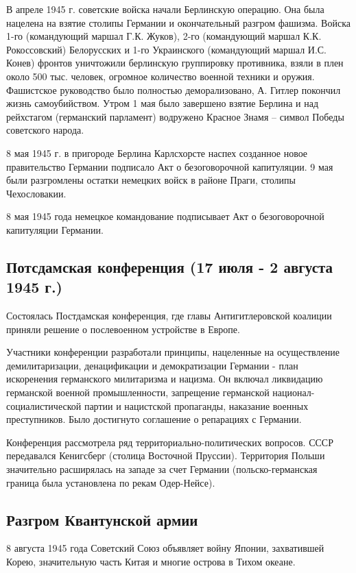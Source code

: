 В апреле 1945 г. советские войска начали Берлинскую операцию.
Она была нацелена на взятие столипы Германии и окончательный разгром фашизма. Войска 1-го (командующий маршал Г.К. Жуков), 2-го (командующий маршал К.К. Рокоссовский) Белорусских и 1-го Украинского (командующий маршал И.С. Конев) фронтов уничтожили берлинскую группировку противника, взяли в плен около 500 тыс. человек,
огромное количество военной техники и оружия. Фашистское руководство было полностью деморализовано, А. Гитлер покончил жизнь самоубийством. Утром 1 мая было завершено взятие Берлина и над рейхстагом (германский парламент) водружено Красное Знамя -- символ Победы советского народа.

8 мая 1945 г. в пригороде Берлина Карлсхорсте наспех созданное новое правительство Германии подписало Акт о безоговорочной капитуляции. 9 мая были разгромлены остатки немецких войск в районе Праги, столипы Чехословакии. 

8 мая 1945 года немецкое командование подписывает Акт о безоговорочной капитуляции Германии.

\subsection{Потсдамская конференция (17 июля - 2 августа 1945 г.)}

Состоялась Постдамская конференция, где главы Антигитлеровской коалиции приняли решение о послевоенном устройстве в Европе.

Участники конференции разработали принципы, нацеленные на осуществление демилитаризации, денацификации и демократизации Германии - план искоренения германского милитаризма и нацизма. Он включал ликвидацию германской военной промышленности, запрещение германской национал-социалистической партии и нацистской пропаганды, наказание военных преступников. Было достигнуто соглашение о репарациях с Германии.

Конференция рассмотрела ряд территориально-политических вопросов. СССР передавался Кенигсберг (столица Восточной Пруссии). Территория Польши значительно расширялась на западе за счет Германии (польско-германская граница была установлена по рекам Одер-Нейсе). 

\subsection{Разгром Квантунской армии}

8 августа 1945 года Советский Союз объявляет войну Японии, захватившей Корею, значительную часть Китая и многие острова в Тихом океане.

